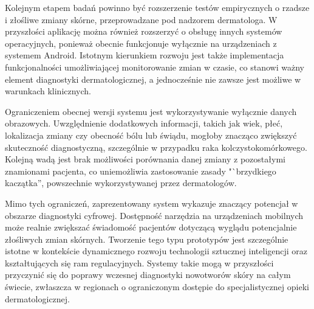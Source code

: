 Kolejnym etapem badań powinno być rozszerzenie testów empirycznych o rzadsze i złośliwe zmiany skórne, przeprowadzane pod nadzorem dermatologa.
W przyszłości aplikację można również rozszerzyć o obsługę innych systemów operacyjnych, ponieważ obecnie funkcjonuje wyłącznie na urządzeniach z systemem Android.
Istotnym kierunkiem rozwoju jest także implementacja funkcjonalności umożliwiającej monitorowanie zmian w czasie, co stanowi ważny element diagnostyki dermatologicznej, a jednocześnie nie zawsze jest możliwe w warunkach klinicznych.

Ograniczeniem obecnej wersji systemu jest wykorzystywanie wyłącznie danych obrazowych.
Uwzględnienie dodatkowych informacji, takich jak wiek, płeć, lokalizacja zmiany czy obecność bólu lub świądu, mogłoby znacząco zwiększyć skuteczność diagnostyczną, szczególnie w przypadku raka kolczystokomórkowego.
Kolejną wadą jest brak możliwości porównania danej zmiany z pozostałymi znamionami pacjenta, co uniemożliwia zastosowanie zasady "`brzydkiego kaczątka'', powszechnie wykorzystywanej przez dermatologów.

Mimo tych ograniczeń, zaprezentowany system wykazuje znaczący potencjał w obszarze diagnostyki cyfrowej.
Dostępność narzędzia na urządzeniach mobilnych może realnie zwiększać świadomość pacjentów dotyczącą wyglądu potencjalnie złośliwych zmian skórnych.
Tworzenie tego typu prototypów jest szczególnie istotne w kontekście dynamicznego rozwoju technologii sztucznej inteligencji oraz kształtujących się ram regulacyjnych.
Systemy takie mogą w przyszłości przyczynić się do poprawy wczesnej diagnostyki nowotworów skóry na całym świecie, zwłaszcza w regionach o ograniczonym dostępie do specjalistycznej opieki dermatologicznej.